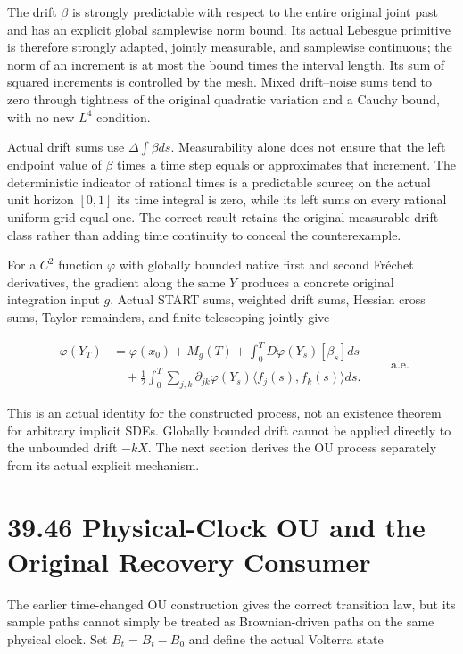 \documentclass[
  english,
  11pt,
  oneside]{book}
\begin{document}
The drift \(\beta\) is strongly predictable with respect to the entire original joint past and has an explicit global samplewise norm bound. Its actual Lebesgue primitive is therefore strongly adapted, jointly measurable, and samplewise continuous; the norm of an increment is at most the bound times the interval length. Its sum of squared increments is controlled by the mesh. Mixed drift--noise sums tend to zero through tightness of the original quadratic variation and a Cauchy bound, with no new \(L^4\) condition.

Actual drift sums use \(\Delta\int\beta ds\). Measurability alone does not ensure that the left endpoint value of \(\beta\) times a time step equals or approximates that increment. The deterministic indicator of rational times is a predictable source; on the actual unit horizon \([0,1]\) its time integral is zero, while its left sums on every rational uniform grid equal one. The correct result retains the original measurable drift class rather than adding time continuity to conceal the counterexample.

For a \(C^2\) function \(\varphi\) with globally bounded native first and second Fréchet derivatives, the gradient along the same \(Y\) produces a concrete original integration input \(g\). Actual START sums, weighted drift sums, Hessian cross sums, Taylor remainders, and finite telescoping jointly give

\[\begin{aligned}
\varphi(Y_T)&=\varphi(x_0)+M_g(T)+\int_0^T D\varphi(Y_s)[\beta_s]ds\\
&\quad+\frac12\int_0^T\sum_{j,k}\partial_{jk}\varphi(Y_s)
\langle f_j(s),f_k(s)\rangle ds.
\end{aligned}
\qquad\text{a.e.}\]

This is an actual identity for the constructed process, not an existence theorem for arbitrary implicit SDEs. Globally bounded drift cannot be applied directly to the unbounded drift \(-kX\). The next section derives the OU process separately from its actual explicit mechanism.

\section{39.46 Physical-Clock OU and the Original Recovery Consumer}\label{physical-clock-ou-and-the-original-recovery-consumer}

The earlier time-changed OU construction gives the correct transition law, but its sample paths cannot simply be treated as Brownian-driven paths on the same physical clock. Set \(\bar B_t=B_t-B_0\) and define the actual Volterra state
\end{document}
